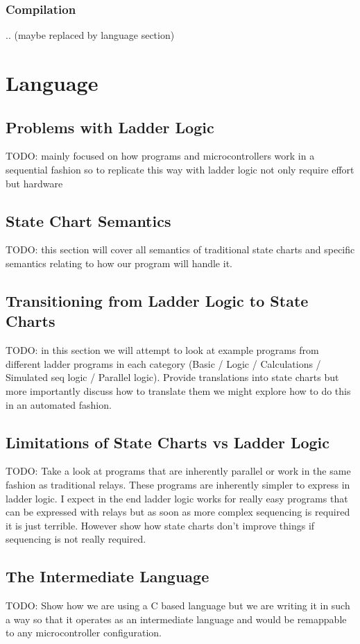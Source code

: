 \documentclass[final,12pt,twoside]{mcthesis}
\begin{document}
\subsection{Compilation}
.. (maybe replaced by language section)

\chapter{Language}
\section{Problems with Ladder Logic}
TODO: mainly focused on how programs and microcontrollers work in a sequential fashion so to replicate this way with ladder logic not only require effort but hardware
\section{State Chart Semantics}
TODO: this section will cover all semantics of traditional state charts and specific semantics relating to how our program will handle it.
\section{Transitioning from Ladder Logic to State Charts}
TODO: in this section we will attempt to look at example programs from different ladder programs in each category (Basic / Logic / Calculations / Simulated seq logic / Parallel logic). Provide translations into state charts but more importantly discuss how to translate them we might explore how to do this in an automated fashion.
\section{Limitations of State Charts vs Ladder Logic}
TODO: Take a look at programs that are inherently parallel or work in the same fashion as traditional relays. These programs are inherently simpler to express in ladder logic. I expect in the end ladder logic works for really easy programs that can be expressed with relays but as soon as more complex sequencing is required it is just terrible. However show how state charts don't improve things if sequencing is not really required.
\section{The Intermediate Language}
TODO: Show how we are using a C based language but we are writing it in such a way so that it operates as an intermediate language and would be remappable to any microcontroller configuration.
\end{document}
